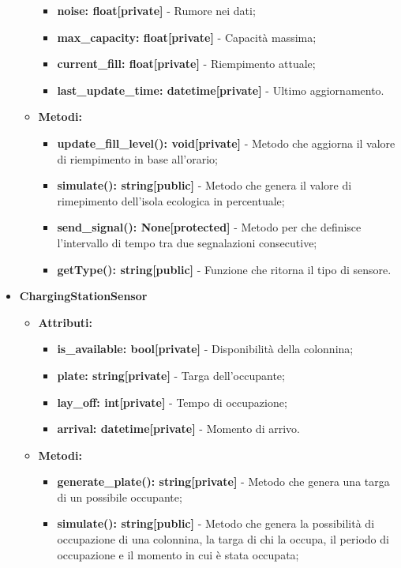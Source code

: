 \documentclass[8pt]{article}
\begin{document}
\begin{itemize}
\begin{itemize}
\begin{itemize}
            \item \textbf{noise: float[private]} - Rumore nei dati;
            \item \textbf{max\_capacity: float[private]} - Capacità massima;
            \item \textbf{current\_fill: float[private]} - Riempimento attuale;
            \item \textbf{last\_update\_time: datetime[private]} - Ultimo aggiornamento.
        \end{itemize}
        \item \textbf{Metodi:}
        \begin{itemize}
            \item \textbf{update\_fill\_level(): void[private]} - Metodo che aggiorna il valore di riempimento in base all'orario;
            \item \textbf{simulate(): string[public]} - Metodo che genera il valore di rimepimento dell'isola ecologica in percentuale;
            \item \textbf{send\_signal(): None[protected]} - Metodo per che definisce l'intervallo di tempo tra due segnalazioni consecutive;
            \item \textbf{getType(): string[public]} - Funzione che ritorna il tipo di sensore.
        \end{itemize}
    \end{itemize}
    \item \textbf{ChargingStationSensor}
    \begin{itemize}
        \item \textbf{Attributi:}
        \begin{itemize}
            \item \textbf{is\_available: bool[private]} - Disponibilità della colonnina;
            \item \textbf{plate: string[private]} - Targa dell'occupante;
            \item \textbf{lay\_off: int[private]} - Tempo di occupazione;
            \item \textbf{arrival: datetime[private]} - Momento di arrivo.
        \end{itemize}
        \item \textbf{Metodi:}
        \begin{itemize}
            \item \textbf{generate\_plate(): string[private]} - Metodo che genera una targa di un possibile occupante;
            \item \textbf{simulate(): string[public]} - Metodo che genera la possibilità di occupazione di una colonnina, la targa di chi la occupa, il periodo di occupazione e il momento in cui è stata occupata;

\end{itemize}
\end{itemize}
\end{itemize}
\end{document}

